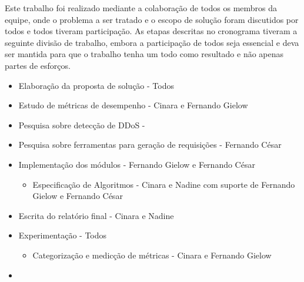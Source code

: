 
Este trabalho foi realizado mediante a colaboração de todos os membros da equipe, onde o problema a ser tratado e o escopo de solução foram discutidos por todos e todos tiveram participação. As etapas descritas no cronograma tiveram a seguinte divisão de trabalho, embora a participação de todos seja essencial e deva ser mantida para que o trabalho tenha um todo como resultado e não apenas partes de esforços.


\begin{itemize}
\item Elaboração da proposta de solução - Todos
\item Estudo de métricas de desempenho - Cinara e Fernando Gielow
\item Pesquisa sobre detecção de DDoS - 
\item Pesquisa sobre ferramentas para geração de requisições - Fernando César
\item Implementação dos módulos - Fernando Gielow e Fernando César
\begin{itemize}
\item Especificação de Algoritmos - Cinara e Nadine com suporte de Fernando Gielow e Fernando César
\end{itemize}
\item Escrita do relatório final - Cinara e Nadine
\item Experimentação - Todos
\begin{itemize}
\item Categorização e medicção de métricas - Cinara e Fernando Gielow
\end{itemize}
\item 
\end{itemize}


